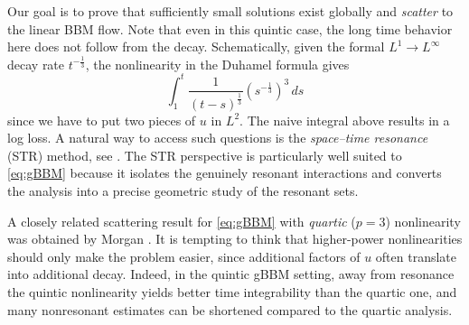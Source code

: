 \documentclass[reqno,english,11pt]{amsart}
\theoremstyle{definition}
\numberwithin{equation}{section}
\begin{document}
Our goal is to prove that sufficiently small solutions exist globally and \emph{scatter} to the linear BBM flow.  Note that even in this quintic case,  the long time behavior here does not follow from the decay. Schematically, given the formal $L^1\rightarrow L^\infty$ decay rate $t^{-\frac{1}{3}}$, the nonlinearity in the Duhamel formula gives
\begin{equation}
    \int_1^t\frac{1}{(t-s)^{\frac{1}{3}}} (s^{-\frac{1}{3}})^3\,ds
\end{equation}since we have to put two pieces of $u$ in $L^2$. The naive integral above results in a log loss.
A natural way to access such questions is the \emph{space--time resonance} (STR) method, see \cites{STR, GMS,GPR,GNT,GNT2}.
The STR perspective is particularly well suited to \eqref{eq:gBBM} because it isolates the genuinely resonant interactions and converts the analysis into a precise geometric study of the resonant sets.



A closely related scattering result for \eqref{eq:gBBM} with \emph{quartic} ($p=3$) nonlinearity was obtained by Morgan \cite{Morgan}.  It is tempting to think that higher-power nonlinearities should only make the problem easier, since additional factors of $u$ often translate into additional decay.  Indeed, in the quintic gBBM setting, away from resonance the quintic nonlinearity yields better time integrability than the quartic one, and many nonresonant estimates can be shortened compared to the quartic analysis.
\end{document}
